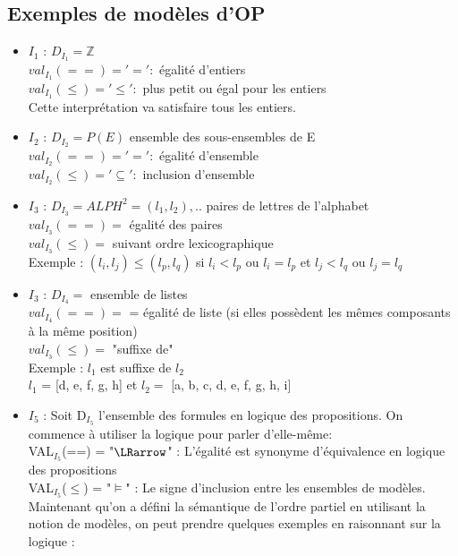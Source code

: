 {\subsection{Exemples de modèles d'OP}
\begin{itemize}
\item \underline{$I_{1}$} : $D_{I_{1}} =  \mathbb{Z}$ \\
$ val_{I_{1}}(==) = '=' :$ égalité d'entiers \\
$ val_{I_{1}}(\leq) = '\leq' :$ plus petit ou égal pour les entiers\\
Cette interprétation va satisfaire tous les entiers.
\item \underline{$I_{2}$} : $D_{I_{2}} =  P(E)$ ensemble des sous-ensembles de E\\
$ val_{I_{2}}(==) = '=' :$ égalité d'ensemble \\
$ val_{I_{2}}(\leq) = '\subseteq' :$ inclusion d'ensemble
\item \underline{$I_{3}$} : $D_{I_{3}} = ALPH^{2} = {(l_{1},l_{2}),..}$ paires de lettres de l'alphabet\\
$ val_{I_{3}}(==) = $ égalité des paires \\
$ val_{I_{3}}(\leq) =$ suivant ordre lexicographique\\
Exemple : $(l_{i},l_{j}) \leq (l_{p},l_{q})$ si $ l_{i} < l_{p}$ ou $ l_{i} = l_{p}$ et $ l_{j} < l_{q}$ ou $ l_{j} = l_{q}$
\item \underline{$I_{3}$} : $D_{I_{4}} =$ ensemble de listes\\
$ val_{I_{4}}(==) = $ = égalité de liste (si elles possèdent les mêmes composants à la même position)\\
$ val_{I_{3}}(\leq) =$ "suffixe de" \\
Exemple : $l_{1} $ est suffixe de $l_{2}$ \\
$l_{1} $ = [d, e, f, g, h] et $l_{2} =$ [a, b, c, d, e, f, g, h, i]
\item \underline{$I_{5}$} : Soit D$_{I_{5}}$ l'ensemble des formules en logique des propositions. On commence à utiliser la logique pour parler d'elle-même:\\
VAL$_{I_{5}}$(==) = "$\LRarrow$" : L'égalité est synonyme d'équivalence en logique des propositions \\
VAL$_{I_{5}}$($\leq$) = "$\models$" : Le signe d'inclusion entre les ensembles de modèles.
Maintenant qu'on a défini la sémantique de l'ordre partiel en utilisant la notion de modèles, on peut prendre quelques exemples en raisonnant sur la logique :\\

\end{itemize}}
